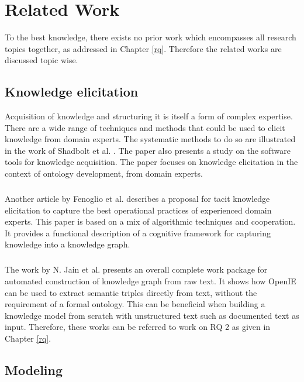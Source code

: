 \chapter{Related Work} \label{rw}

\bigskip \bigskip To the best knowledge, there exists no prior work which encompasses all research topics together, as addressed in Chapter \ref{rq}. Therefore the related works are discussed topic wise.

\section{Knowledge elicitation}
Acquisition of knowledge and structuring it is itself a form of complex expertise. There are a wide range of techniques and methods that could be used to elicit knowledge from domain experts. The systematic methods to do so are illustrated in the work of Shadbolt et al. \cite{shadbolt2015}. The paper \cite{shadbolt2015} also presents a study on the software tools for knowledge acquisition. The paper focuses on knowledge elicitation in the context of ontology development, from domain experts. 

\paragraph{} Another article by Fenoglio et al. \cite{Fenoglio2022} describes a proposal for tacit knowledge elicitation to capture the best operational practices of experienced domain experts. This paper is based on a mix of algorithmic techniques and cooperation. It provides a functional description of a cognitive framework for capturing knowledge into a knowledge graph.

\paragraph{} The work by N. Jain et al. \cite{text2kg} presents an overall complete work package for automated construction of knowledge graph from raw text. It shows how OpenIE can be used to extract semantic triples directly from text, without the requirement of a formal ontology. This can be beneficial when building a knowledge model from scratch with unstructured text such as documented text as input. Therefore, these works can be referred to work on RQ 2 as given in Chapter \ref{rq}.

\section{Modeling}

